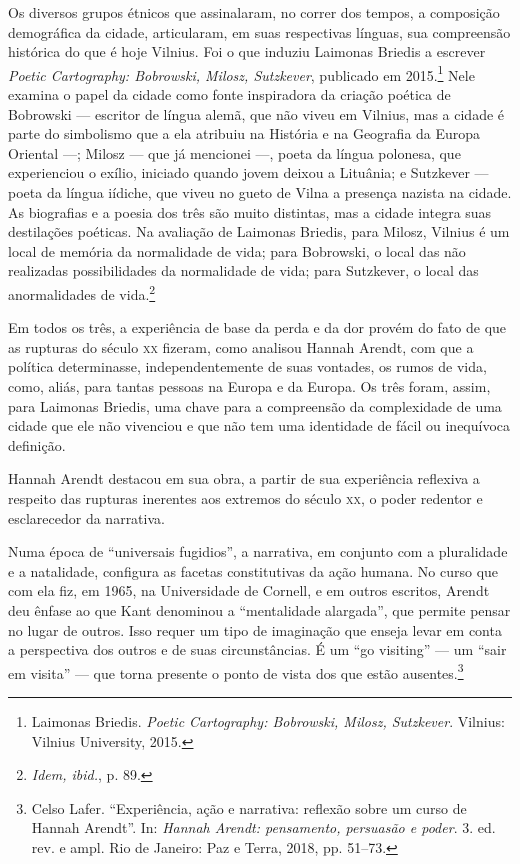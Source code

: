 Os diversos grupos étnicos que assinalaram, no correr dos tempos, a
composição demográfica da cidade, articularam, em suas respectivas
línguas, sua compreensão histórica do que é hoje Vilnius. Foi o que
induziu Laimonas Briedis a escrever \emph{Poetic Cartography:
 Bobrowski, Milosz, Sutzkever}, publicado em 2015.\footnote{Laimonas Briedis.
  \emph{Poetic Cartography: Bobrowski, Milosz, Sutzkever}. Vilnius: Vilnius University, 2015.} Nele examina
o papel da cidade como fonte inspiradora da criação poética de Bobrowski
--- escritor de língua alemã, que não viveu em Vilnius, mas a cidade é
parte do simbolismo que a ela atribuiu na História e na Geografia da
Europa Oriental ---; Milosz --- que já mencionei ---, poeta da língua
polonesa, que experienciou o exílio, iniciado quando jovem deixou a
Lituânia; e Sutzkever --- poeta da língua iídiche, que viveu no gueto de
Vilna a presença nazista na cidade. As biografias e a poesia dos três
são muito distintas, mas a cidade integra suas destilações poéticas. Na
avaliação de Laimonas Briedis, para Milosz, Vilnius é um local de
memória da normalidade de vida; para Bobrowski, o local das não
realizadas possibilidades da normalidade de vida; para Sutzkever, o
local das anormalidades de vida.\footnote{\emph{Idem, ibid.}, p. 89.}

Em todos os três, a experiência de base da perda e da dor provém do fato
de que as rupturas do século \textsc{xx} fizeram, como analisou Hannah Arendt,
com que a política determinasse, independentemente de suas vontades, os
rumos de vida, como, aliás, para tantas pessoas na Europa e da Europa.
Os três foram, assim, para Laimonas Briedis, uma chave para a
compreensão da complexidade de uma cidade que ele não vivenciou e que
não tem uma identidade de fácil ou inequívoca definição.

Hannah Arendt destacou em sua obra, a partir de sua experiência
reflexiva a respeito das rupturas inerentes aos extremos do século \textsc{xx}, o
poder redentor e esclarecedor da narrativa.

Numa época de ``universais fugidios'', a narrativa, em conjunto com a
pluralidade e a natalidade, configura as facetas constitutivas da ação
humana. No curso que com ela fiz, em 1965, na Universidade de Cornell, e
em outros escritos, Arendt deu ênfase ao que Kant denominou a
``mentalidade alargada'', que permite pensar no lugar de outros. Isso
requer um tipo de imaginação que enseja levar em conta a perspectiva dos
outros e de suas circunstâncias. É um ``go visiting'' --- um ``sair em
visita'' --- que torna presente o ponto de vista dos que estão
ausentes.\footnote{Celso Lafer. ``Experiência, ação e narrativa:
  reflexão sobre um curso de Hannah Arendt''. In: \emph{Hannah Arendt:
  pensamento, persuasão e poder}. 3. ed. rev. e ampl. Rio de Janeiro:
  Paz e Terra, 2018, pp. 51--73.}

